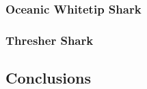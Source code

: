 \documentclass[12pt]{SCreport}
\begin{document}




 \subsubsection{Oceanic Whitetip Shark}
          



  \subsubsection{Thresher Shark}
          


      \subsection{Conclusions}            
      
 \clearpage     
      
\end{document}
